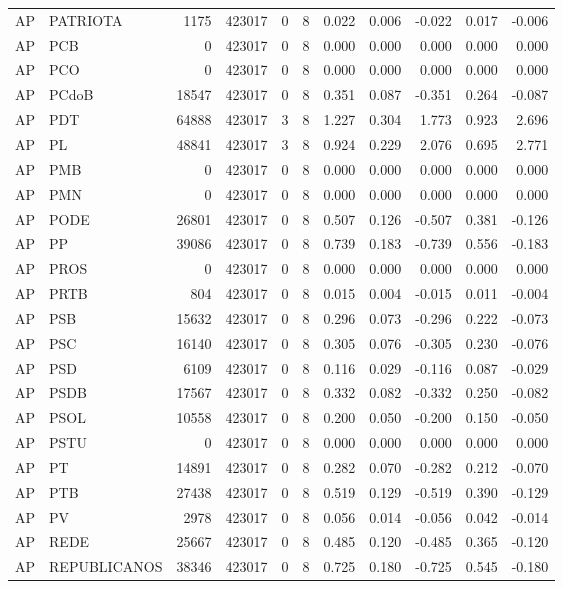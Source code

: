 \begin{landscape}
\begin{longtable}{llrrrrrrrrr}
AP & PATRIOTA & 1175 & 423017 & 0 & 8 & 0.022 & 0.006 & -0.022 & 0.017 & -0.006 \\
AP & PCB & 0 & 423017 & 0 & 8 & 0.000 & 0.000 & 0.000 & 0.000 & 0.000 \\
AP & PCO & 0 & 423017 & 0 & 8 & 0.000 & 0.000 & 0.000 & 0.000 & 0.000 \\
AP & PCdoB & 18547 & 423017 & 0 & 8 & 0.351 & 0.087 & -0.351 & 0.264 & -0.087 \\
AP & PDT & 64888 & 423017 & 3 & 8 & 1.227 & 0.304 & 1.773 & 0.923 & 2.696 \\
AP & PL & 48841 & 423017 & 3 & 8 & 0.924 & 0.229 & 2.076 & 0.695 & 2.771 \\
AP & PMB & 0 & 423017 & 0 & 8 & 0.000 & 0.000 & 0.000 & 0.000 & 0.000 \\
AP & PMN & 0 & 423017 & 0 & 8 & 0.000 & 0.000 & 0.000 & 0.000 & 0.000 \\
AP & PODE & 26801 & 423017 & 0 & 8 & 0.507 & 0.126 & -0.507 & 0.381 & -0.126 \\
AP & PP & 39086 & 423017 & 0 & 8 & 0.739 & 0.183 & -0.739 & 0.556 & -0.183 \\
AP & PROS & 0 & 423017 & 0 & 8 & 0.000 & 0.000 & 0.000 & 0.000 & 0.000 \\
AP & PRTB & 804 & 423017 & 0 & 8 & 0.015 & 0.004 & -0.015 & 0.011 & -0.004 \\
AP & PSB & 15632 & 423017 & 0 & 8 & 0.296 & 0.073 & -0.296 & 0.222 & -0.073 \\
AP & PSC & 16140 & 423017 & 0 & 8 & 0.305 & 0.076 & -0.305 & 0.230 & -0.076 \\
AP & PSD & 6109 & 423017 & 0 & 8 & 0.116 & 0.029 & -0.116 & 0.087 & -0.029 \\
AP & PSDB & 17567 & 423017 & 0 & 8 & 0.332 & 0.082 & -0.332 & 0.250 & -0.082 \\
AP & PSOL & 10558 & 423017 & 0 & 8 & 0.200 & 0.050 & -0.200 & 0.150 & -0.050 \\
AP & PSTU & 0 & 423017 & 0 & 8 & 0.000 & 0.000 & 0.000 & 0.000 & 0.000 \\
AP & PT & 14891 & 423017 & 0 & 8 & 0.282 & 0.070 & -0.282 & 0.212 & -0.070 \\
AP & PTB & 27438 & 423017 & 0 & 8 & 0.519 & 0.129 & -0.519 & 0.390 & -0.129 \\
AP & PV & 2978 & 423017 & 0 & 8 & 0.056 & 0.014 & -0.056 & 0.042 & -0.014 \\
AP & REDE & 25667 & 423017 & 0 & 8 & 0.485 & 0.120 & -0.485 & 0.365 & -0.120 \\
AP & REPUBLICANOS & 38346 & 423017 & 0 & 8 & 0.725 & 0.180 & -0.725 & 0.545 & -0.180 \\

\end{longtable}
\end{landscape}

